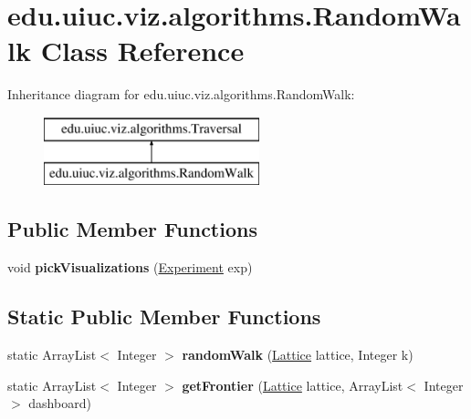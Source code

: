\hypertarget{classedu_1_1uiuc_1_1viz_1_1algorithms_1_1_random_walk}{}\section{edu.\+uiuc.\+viz.\+algorithms.\+Random\+Walk Class Reference}
\label{classedu_1_1uiuc_1_1viz_1_1algorithms_1_1_random_walk}
Inheritance diagram for edu.\+uiuc.\+viz.\+algorithms.\+Random\+Walk\+:\begin{figure}[H]
\begin{center}
\leavevmode
\includegraphics[height=2.000000cm]{classedu_1_1uiuc_1_1viz_1_1algorithms_1_1_random_walk}
\end{center}
\end{figure}
\subsection*{Public Member Functions}
\begin{DoxyCompactItemize}
\item 
\mbox{\label{classedu_1_1uiuc_1_1viz_1_1algorithms_1_1_random_walk_a6e90f412c77f7b6db68e8f814098e6a0}} 
void {\bfseries pick\+Visualizations} (\mbox{\hyperlink{classedu_1_1uiuc_1_1viz_1_1algorithms_1_1_experiment}{Experiment}} exp)
\end{DoxyCompactItemize}
\subsection*{Static Public Member Functions}
\begin{DoxyCompactItemize}
\item 
\mbox{\label{classedu_1_1uiuc_1_1viz_1_1algorithms_1_1_random_walk_a6b5c83a79dc12689b9f935965ad61d70}} 
static Array\+List$<$ Integer $>$ {\bfseries random\+Walk} (\mbox{\hyperlink{classedu_1_1uiuc_1_1viz_1_1lattice_1_1_lattice}{Lattice}} lattice, Integer k)
\item 
\mbox{\label{classedu_1_1uiuc_1_1viz_1_1algorithms_1_1_random_walk_a79d483753cf3684e787410b68eb97cf8}} 
static Array\+List$<$ Integer $>$ {\bfseries get\+Frontier} (\mbox{\hyperlink{classedu_1_1uiuc_1_1viz_1_1lattice_1_1_lattice}{Lattice}} lattice, Array\+List$<$ Integer $>$ dashboard)
\end{DoxyCompactItemize}



